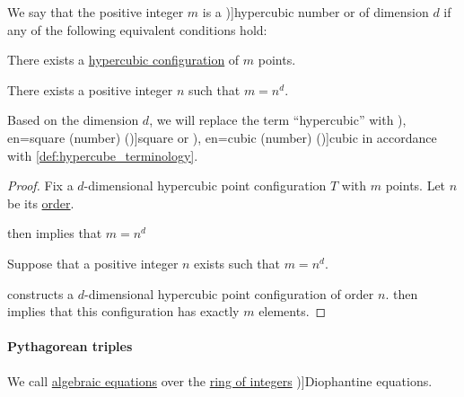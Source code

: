 \begin{definition}\label{def:hypercubic_number}
  We say that the positive integer \( m \) is a \term[en=hypercube number (\cite[\S 3.2.4]{Deza2012FigurateNumbers})]{hypercubic number} or  of dimension \( d \) if any of the following equivalent conditions hold:
  \begin{thmenum}
    \mimprovised There exists a \hyperref[def:hypercubic_point_configuration]{hypercubic configuration} of \( m \) points.

     There exists a positive integer \( n \) such that \( m = n^d \).
  \end{thmenum}

  Based on the dimension \( d \), we will replace the term \enquote{hypercubic} with \term[ru=квадратное (число) (\cite[14]{Розенфельд1963ОсновныеПонятиеГеометрии}), en=square (number) (\cite[1]{Deza2012FigurateNumbers})]{square} or \term[ru=кубическое (число) (\cite[14]{Розенфельд1963ОсновныеПонятиеГеометрии}), en=cubic (number) (\cite[1]{Deza2012FigurateNumbers})]{cubic} in accordance with \cref{def:hypercube_terminology}.
\end{definition}
\begin{proof}
   Fix a \( d \)-dimensional hypercubic point configuration \( T \) with \( m \) points. Let \( n \) be its \hyperref[def:hypercubic_point_configuration_order]{order}.

   then implies that \( m = n^d \)

   Suppose that a positive integer \( n \) exists such that \( m = n^d \).

   constructs a \( d \)-dimensional hypercubic point configuration of order \( n \).  then implies that this configuration has exactly \( m \) elements.
\end{proof}

\paragraph{Pythagorean triples}

\begin{definition}\label{def:diophantine_equation}
  We call \hyperref[def:algebraic_equation]{algebraic equations} over the \hyperref[def:integers]{ring of integers} \term[ru=Диофантово уравнение (\cite[\S 1.9]{ШеньВерещагин2017ВычислимыеФункции})]{Diophantine equations}.
\end{definition}


